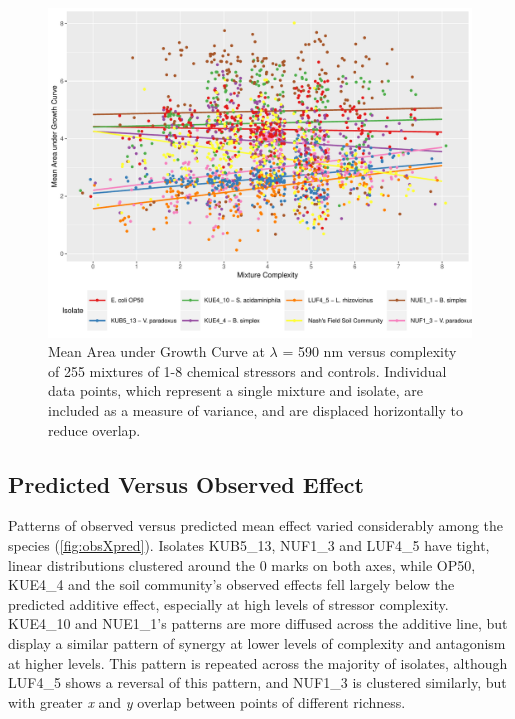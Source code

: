 \documentclass[10pt]{article}
\begin{document}
\begin{figure}[H]
    \centering
    \includegraphics[width = \textwidth]{Scripts/Results/Final_Pipeline/growthXrichness.pdf}
    \caption{Mean Area under Growth Curve at $\lambda$ = 590 nm versus complexity of 255 mixtures of 1-8 chemical stressors and controls. Individual data points, which represent a single mixture and isolate, are included as a measure of variance, and are displaced horizontally to reduce overlap.}
    \label{fig:growthXcomplex}
\end{figure}

\newpage
\subsection{Predicted Versus Observed Effect}
\label{S:3:5}

Patterns of observed versus predicted mean effect varied considerably among the species (\cref{fig:obsXpred}). Isolates KUB5\_13, NUF1\_3 and LUF4\_5 have tight, linear distributions clustered around the 0 marks on both axes, while OP50, KUE4\_4 and the soil community’s observed effects fell largely below the predicted additive effect, especially at high levels of stressor complexity. KUE4\_10 and NUE1\_1’s patterns are more diffused across the additive line, but display a similar pattern of synergy at lower levels of complexity and antagonism at higher levels. This pattern is repeated across the majority of isolates, although LUF4\_5 shows a reversal of this pattern, and NUF1\_3 is clustered similarly, but with greater \textit{x} and \textit{y} overlap between points of different richness.
\end{document}
